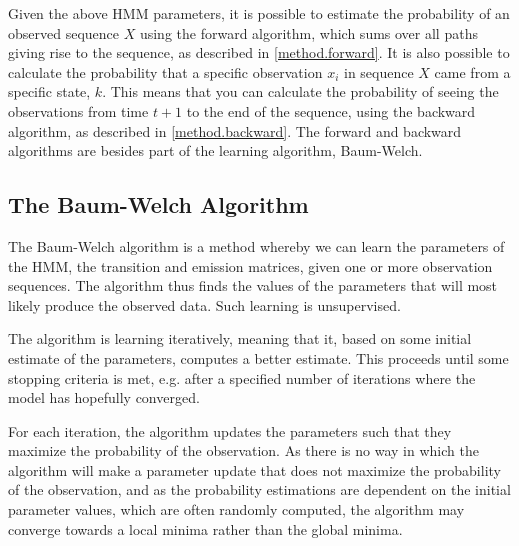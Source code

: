 Given the above HMM parameters, it is possible to estimate the probability of an observed sequence $X$ using the forward algorithm, which sums over all paths giving rise to the sequence, as described in \autoref{method.forward}. It is also possible to calculate the probability that a specific observation $x_i$ in sequence $X$ came from a specific state, $k$. This means that you can calculate the probability of seeing the observations from time $t+1$ to the end of the sequence, using the backward algorithm, as described in \autoref{method.backward}. 
The forward and backward algorithms are besides part of the learning algorithm, Baum-Welch.



\subsection{The Baum-Welch Algorithm} \label{intro.baum_welch}
The Baum-Welch algorithm is a method whereby we can learn the parameters of the HMM, the transition and emission matrices, given one or more observation sequences. The algorithm thus finds the values of the parameters that will most likely produce the observed data. Such learning is unsupervised.

The algorithm is learning iteratively, meaning that it, based on some initial estimate of the parameters, computes a better estimate. This proceeds until some stopping criteria is met, e.g. after a specified number of iterations where the model has hopefully converged.

For each iteration, the algorithm updates the parameters such that they maximize the probability of the observation. As there is no way in which the algorithm will make a parameter update that does not maximize the probability of the observation, and as the probability estimations are dependent on the initial parameter values, which are often randomly computed, the algorithm may converge towards a local minima rather than the global minima. 







